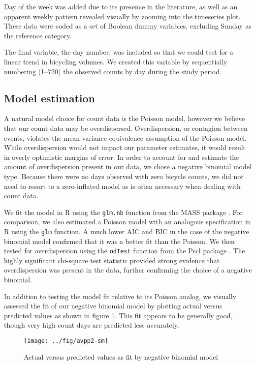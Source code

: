 \documentclass[12pt,letterpaper,article]{memoir} %
\begin{document}
Day of the week was added due to its presence in the literature, as
well as an apparent weekly pattern revealed visually by zooming into
the timeseries plot. These data were coded as a set of Boolean dummy
variables, excluding Sunday as the reference category.

The final variable, the day number, was included so that we could test
for a linear trend in bicycling volumes. We created this variable by
sequentially numbering (1--720) the observed counts by day during the study period.

\subsection*{Model estimation}
A natural model choice for count data is the Poisson model, however we
believe that our count data may be overdispersed. Overdispersion, or
contagion between events, violates the mean-variance equivalence
assumption of the Poisson model. While overdispersion would not impact
our parameter estimates, it would result in overly optimistic margins
of error. In order to account for and estimate the amount of
overdispersion present in our data, we chose a negative binomial model
type. Because there were no days observed with zero bicycle counts, we
did not need to resort to a zero-inflated model as is often necessary
when dealing with count data.

We fit the model in R using the \texttt{glm.nb} function from the MASS
package \parencite{Venables:2002aa}. For comparison, we also estimated a
Poisson model with an analogous specification in R using the
\texttt{glm} function. A much lower AIC and BIC in the case of the
negative binomial model confirmed that it was a better fit than the
Poisson. We then tested for overdispersion using the \texttt{odTest} function
from the Pscl package \parencite{Jackman:2014aa}. The highly significant
chi-square test statistic provided strong evidence that overdispersion
was present in the data, further confirming the choice of a negative
binomial.

In addition to testing the model fit relative to its Poisson
analog, we visually assessed the fit of our negative binomial model by
plotting actual versus predicted values as shown in figure
\ref{fg:avp}. This fit appears to be generally good, though very high
count days are predicted less accurately.

\begin{figure}[h!]
  \centering
  \texttt{[image: ../fig/avpp2-sm]}
  \caption{Actual versus predicted values as fit by negative binomial model}
  \label{fg:avp}
\end{figure}
\end{document}
